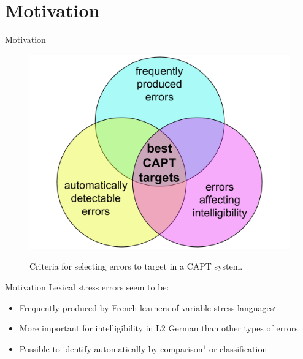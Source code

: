 \documentclass[xcolor={dvipsnames}]{beamer}
\begin{document}
\section{Motivation}
\begin{frame}{Motivation}
		\begin{figure}
			\centering
			\caption{Criteria for selecting errors to target in a CAPT system.}
			\includegraphics[width=.8\textwidth]{../img/error-venn}
			\label{fig:errors}
		\end{figure}
\end{frame}

\begin{frame}{Motivation}
Lexical stress errors seem to be: 
\begin{itemize}
\item Frequently produced by French learners of variable-stress languages$^{,}$
\item More important for intelligibility in L2 German than other types of errors
\item Possible to identify automatically by comparison$^1$ or classification
\end{itemize}

\end{frame}
\end{document}
